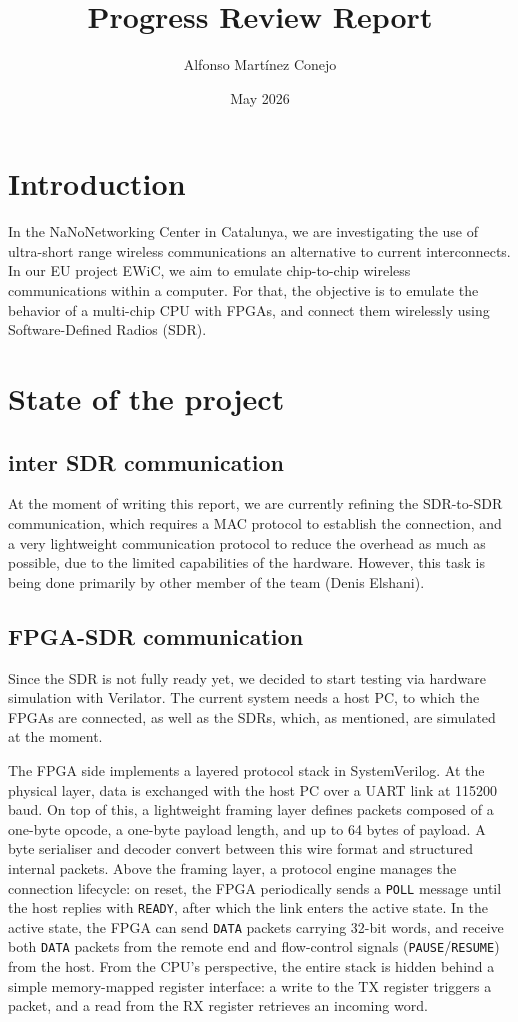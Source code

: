 \documentclass{article}
\title{Progress Review Report}
\author{Alfonso Martínez Conejo}
\date{May 2026}
\begin{document}


\maketitle

\section{Introduction}
In the NaNoNetworking Center in Catalunya, we are investigating the use of ultra-short range wireless communications an alternative to current interconnects. In our EU project EWiC, we aim to emulate chip-to-chip wireless communications within a computer. For that, the objective is to emulate the behavior of a multi-chip CPU with FPGAs, and connect them wirelessly using Software-Defined Radios (SDR).

\section{State of the project}
\subsection{inter SDR communication}
At the moment of writing this report, we are currently refining the SDR-to-SDR communication, which requires a MAC protocol to establish the connection, and a very lightweight communication protocol to reduce the overhead as much as possible, due to the limited capabilities of the hardware. However, this task is being done primarily by other member of the team (Denis Elshani).

\subsection{FPGA-SDR communication}
Since the SDR is not fully ready yet, we decided to start testing via hardware simulation with Verilator. The current system needs a host PC, to which the FPGAs are connected, as well as the SDRs, which, as mentioned, are simulated at the moment.

The FPGA side implements a layered protocol stack in SystemVerilog. At the physical layer, data is exchanged with the host PC over a UART link at 115200 baud. On top of this, a lightweight framing layer defines packets composed of a one-byte opcode, a one-byte payload length, and up to 64 bytes of payload. A byte serialiser and decoder convert between this wire format and structured internal packets. Above the framing layer, a protocol engine manages the connection lifecycle: on reset, the FPGA periodically sends a \texttt{POLL} message until the host replies with \texttt{READY}, after which the link enters the active state. In the active state, the FPGA can send \texttt{DATA} packets carrying 32-bit words, and receive both \texttt{DATA} packets from the remote end and flow-control signals (\texttt{PAUSE}/\texttt{RESUME}) from the host. From the CPU's perspective, the entire stack is hidden behind a simple memory-mapped register interface: a write to the TX register triggers a packet, and a read from the RX register retrieves an incoming word.
\end{document}

